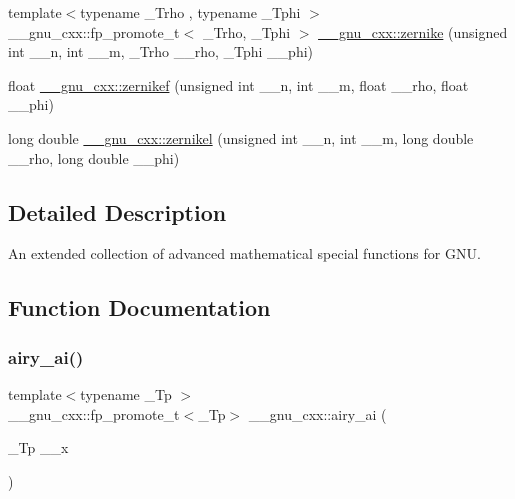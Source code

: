 \begin{DoxyCompactItemize}
{\footnotesize template$<$typename \+\_\+\+Trho , typename \+\_\+\+Tphi $>$ }\\\+\_\+\+\_\+gnu\+\_\+cxx\+::fp\+\_\+promote\+\_\+t$<$ \+\_\+\+Trho, \+\_\+\+Tphi $>$ \hyperlink{group__gnu__math__spec__func_gaaed33f29c1eb1d2c5b9590fe2e57151c}{\+\_\+\+\_\+gnu\+\_\+cxx\+::zernike} (unsigned int \+\_\+\+\_\+n, int \+\_\+\+\_\+m, \+\_\+\+Trho \+\_\+\+\_\+rho, \+\_\+\+Tphi \+\_\+\+\_\+phi)
\item 
float \hyperlink{group__gnu__math__spec__func_gababce1066ecef7258070b9b7fcea975f}{\+\_\+\+\_\+gnu\+\_\+cxx\+::zernikef} (unsigned int \+\_\+\+\_\+n, int \+\_\+\+\_\+m, float \+\_\+\+\_\+rho, float \+\_\+\+\_\+phi)
\item 
long double \hyperlink{group__gnu__math__spec__func_ga9236dd8545b448da9cb05dd8b7cf6811}{\+\_\+\+\_\+gnu\+\_\+cxx\+::zernikel} (unsigned int \+\_\+\+\_\+n, int \+\_\+\+\_\+m, long double \+\_\+\+\_\+rho, long double \+\_\+\+\_\+phi)
\end{DoxyCompactItemize}


\subsection{Detailed Description}
An extended collection of advanced mathematical special functions for G\+NU. 

\subsection{Function Documentation}
\mbox{\label{group__gnu__math__spec__func_gac84f8c4ad00ee677ad4d0b785925d983}} 
\subsubsection{\texorpdfstring{airy\+\_\+ai()}{airy\_ai()}\hspace{0.1cm}{\footnotesize\ttfamily [1/2]}}
{\footnotesize\ttfamily template$<$typename \+\_\+\+Tp $>$ \\
\+\_\+\+\_\+gnu\+\_\+cxx\+::fp\+\_\+promote\+\_\+t$<$\+\_\+\+Tp$>$ \+\_\+\+\_\+gnu\+\_\+cxx\+::airy\+\_\+ai (\begin{DoxyParamCaption}\item[{\+\_\+\+Tp}]{\+\_\+\+\_\+x }\end{DoxyParamCaption})\hspace{0.3cm}{\ttfamily [inline]}}

